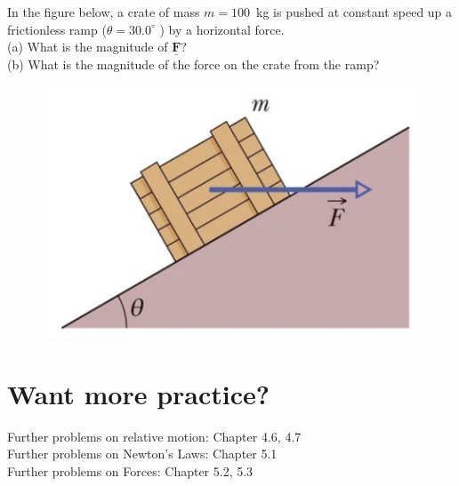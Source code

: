 \documentclass[11pt]{article}
\newcommand\vect[1]{\underline{\mathbf{#1}}}
\begin{document}
In the figure below, a crate of mass $m = 100$~kg is pushed at constant speed up a frictionless ramp ($\theta= 30.0^{\circ}$ ) by a horizontal force. \\
(a) What is the magnitude of $\vect{F}$?\\
(b) What is the magnitude of the force on the crate from the ramp?
\begin{figure}[h]
\includegraphics[scale=0.5]{2021-W4-Q4}
\end{figure}


\section*{Want more practice?}
\small
Further problems on relative motion: Chapter 4.6, 4.7 \\
Further problems on Newton's Laws: Chapter 5.1 \\
Further problems on Forces: Chapter 5.2, 5.3 \\
\end{document}
